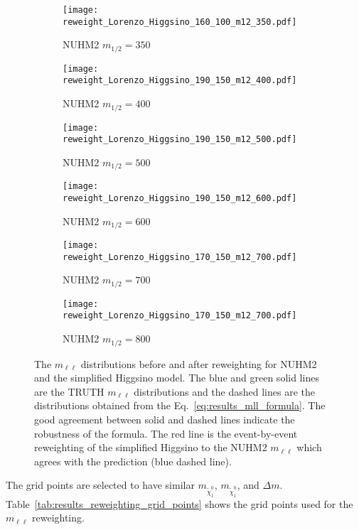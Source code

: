 \begin{figure}[htbp]
    \begin{center}
        \begin{subfigure}[b]{0.48\textwidth}
            \texttt{[image: reweight\_Lorenzo\_Higgsino\_160\_100\_m12\_350.pdf]}
            \caption{NUHM2 $m_{1/2}=350$~{\GeV}}
        \end{subfigure}
        \begin{subfigure}[b]{0.48\textwidth}
            \texttt{[image: reweight\_Lorenzo\_Higgsino\_190\_150\_m12\_400.pdf]}
            \caption{NUHM2 $m_{1/2}=400$~{\GeV}}
        \end{subfigure}
        \begin{subfigure}[b]{0.48\textwidth}
            \texttt{[image: reweight\_Lorenzo\_Higgsino\_190\_150\_m12\_500.pdf]}
            \caption{NUHM2 $m_{1/2}=500$~{\GeV}}
        \end{subfigure}
        \begin{subfigure}[b]{0.48\textwidth}
            \texttt{[image: reweight\_Lorenzo\_Higgsino\_190\_150\_m12\_600.pdf]}
            \caption{NUHM2 $m_{1/2}=600$~{\GeV}}
        \end{subfigure}
        \begin{subfigure}[b]{0.48\textwidth}
            \texttt{[image: reweight\_Lorenzo\_Higgsino\_170\_150\_m12\_700.pdf]}
            \caption{NUHM2 $m_{1/2}=700$~{\GeV}}
        \end{subfigure}
        \begin{subfigure}[b]{0.48\textwidth}
            \texttt{[image: reweight\_Lorenzo\_Higgsino\_170\_150\_m12\_700.pdf]}
            \caption{NUHM2 $m_{1/2}=800$~{\GeV}}
        \end{subfigure}
    \end{center}
    \caption{
    {\small The $m_{\ell \ell}$ distributions before and after reweighting for NUHM2 and the simplified Higgsino model.
    The blue and green solid lines are the TRUTH $m_{\ell \ell}$ distributions and the dashed lines are the distributions obtained from the Eq.~\ref{eq:results_mll_formula}.
    The good agreement between solid and dashed lines indicate the robustness of the formula.
    The red line is the event-by-event reweighting of the simplified Higgsino to the NUHM2 $m_{\ell \ell}$ which agrees with the prediction (blue dashed line).}
    }
    \label{fig:results_nuhm2_reweighting}
\end{figure}

The grid points are selected to have similar $m_{\widetilde{\chi}^{0}_{1}}$, $m_{\widetilde{\chi}^{0}_{1}}$, and $\Delta m$.
Table~\ref{tab:results_reweighting_grid_points} shows the grid points used for the $m_{\ell \ell}$ reweighting.

